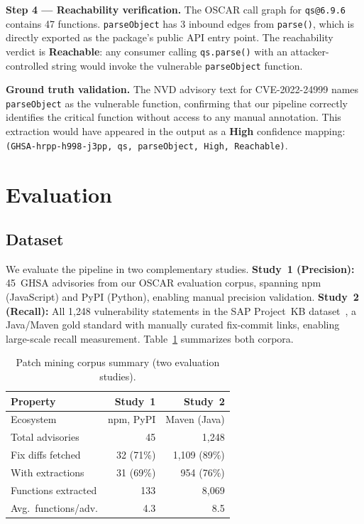 \documentclass[sigconf,nonacm]{acmart}
\begin{document}
\textbf{Step 4 — Reachability verification.}
The OSCAR call graph for \texttt{qs@6.9.6} contains 47 functions.
\texttt{parseObject} has 3 inbound edges from \texttt{parse()}, which is
directly exported as the package's public API entry point.
The reachability verdict is \textbf{Reachable}: any consumer calling
\texttt{qs.parse()} with an attacker-controlled string would invoke the
vulnerable \texttt{parseObject} function.

\textbf{Ground truth validation.}
The NVD advisory text for CVE-2022-24999 names \texttt{parseObject} as the
vulnerable function, confirming that our pipeline correctly identifies the
critical function without access to any manual annotation.
This extraction would have appeared in the output as a \textbf{High} confidence
mapping: \texttt{(GHSA-hrpp-h998-j3pp, qs, parseObject, High, Reachable)}.

\section{Evaluation}
\label{sec:eval}

\subsection{Dataset}

We evaluate the pipeline in two complementary studies.
\textbf{Study~1 (Precision):} 45~GHSA advisories from our OSCAR evaluation
corpus, spanning npm (JavaScript) and PyPI (Python), enabling manual
precision validation.
\textbf{Study~2 (Recall):} All 1{,}248 vulnerability statements in the SAP
Project~KB dataset~\cite{ponta2019projectkb}, a Java/Maven gold standard
with manually curated fix-commit links, enabling large-scale recall
measurement.
Table~\ref{tab:dataset} summarizes both corpora.

\begin{table}[t]
    \centering
    \caption{Patch mining corpus summary (two evaluation studies).}
    \label{tab:dataset}
    \begin{tabular}{lrr}
        \toprule
        \textbf{Property} & \textbf{Study~1} & \textbf{Study~2} \\
        \midrule
        Ecosystem           & npm, PyPI    & Maven (Java) \\
        Total advisories    & 45           & 1{,}248 \\
        Fix diffs fetched   & 32 (71\%)    & 1{,}109 (89\%) \\
        With extractions    & 31 (69\%)    & 954 (76\%) \\
        Functions extracted & 133          & 8{,}069 \\
        Avg.\ functions/adv. & 4.3         & 8.5 \\
        \bottomrule
    \end{tabular}
\end{table}
\end{document}
